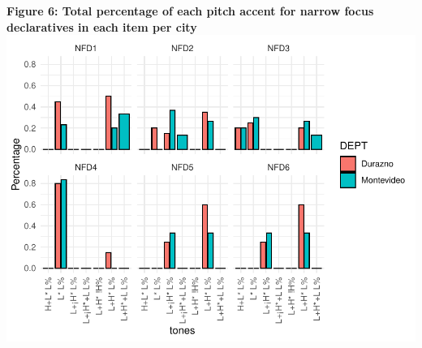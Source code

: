 \documentclass[
  man]{apa6}
\begin{document}
\textbf{Figure 6: Total percentage of each pitch accent for narrow focus declaratives in each item per city}
\includegraphics{main_files/figure-latex/unnamed-chunk-14-1.pdf}
\end{document}
